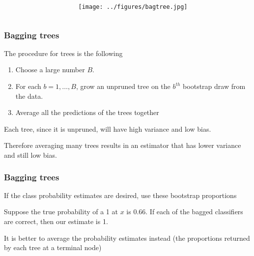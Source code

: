 \documentclass[12pt]{beamer}
\begin{document}
\begin{frame}
  \begin{columns}[c]
    \begin{column}{.45\paperwidth}
      \begin{center}
      \end{center}
    \end{column}
    \begin{column}{.5\paperwidth}
      \begin{center}
        \texttt{[image: ../figures/bagtree.jpg]}
      \end{center}
    \end{column}
  \end{columns}
\end{frame}


\begin{frame}[fragile]
\frametitle{Bagging trees}
The procedure for trees is the following
\begin{enumerate}
\item Choose a large number $B$.
\item For each $b = 1,\ldots, B$, grow an unpruned tree on the $b^{th}$ bootstrap draw from the data.
\item Average all the predictions of the trees together 

\end{enumerate}
\vsp

Each tree, since it is unpruned, will have high variance and
low bias.

\vsp
Therefore averaging many trees results in an estimator that has lower variance and still low bias.
\end{frame}

\begin{frame}[fragile]
\frametitle{Bagging trees}
If the class probability estimates are desired,  use these bootstrap proportions

\vsp
{}  Suppose the true probability of a 1 at $x$ is 0.66.  If each of the bagged classifiers
are correct, then our estimate is 1.

\vsp
It is better to average the probability estimates instead (the proportions returned by each tree at a terminal node)
\end{frame}
\end{document}

